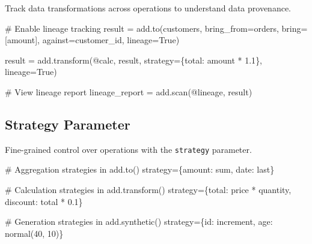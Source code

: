 \documentclass[
  letterpaper,
]{scrbook}
\newenvironment{Shaded}{\begin{snugshade}}{\end{snugshade}}
\newcommand{\CommentTok}[1]{\textcolor[rgb]{0.37,0.37,0.37}{#1}}
\newcommand{\NormalTok}[1]{\textcolor[rgb]{0.00,0.23,0.31}{#1}}
\newcommand{\OperatorTok}[1]{\textcolor[rgb]{0.37,0.37,0.37}{#1}}
\newcommand{\StringTok}[1]{\textcolor[rgb]{0.13,0.47,0.30}{#1}}
\newcommand{\VariableTok}[1]{\textcolor[rgb]{0.07,0.07,0.07}{#1}}
\begin{document}
Track data transformations across operations to understand data
provenance.

\begin{Shaded}
\begin{Highlighting}[]
\CommentTok{\# Enable lineage tracking}
\NormalTok{result }\OperatorTok{=}\NormalTok{ add.to(customers, bring\_from}\OperatorTok{=}\NormalTok{orders, bring}\OperatorTok{=}\NormalTok{[}\StringTok{\textquotesingle{}amount\textquotesingle{}}\NormalTok{], }
\NormalTok{                against}\OperatorTok{=}\StringTok{\textquotesingle{}customer\_id\textquotesingle{}}\NormalTok{, lineage}\OperatorTok{=}\VariableTok{True}\NormalTok{)}

\NormalTok{result }\OperatorTok{=}\NormalTok{ add.transform(}\StringTok{\textquotesingle{}@calc\textquotesingle{}}\NormalTok{, result, strategy}\OperatorTok{=}\NormalTok{\{}\StringTok{\textquotesingle{}total\textquotesingle{}}\NormalTok{: }\StringTok{\textquotesingle{}amount * 1.1\textquotesingle{}}\NormalTok{\}, }
\NormalTok{                       lineage}\OperatorTok{=}\VariableTok{True}\NormalTok{)}

\CommentTok{\# View lineage report}
\NormalTok{lineage\_report }\OperatorTok{=}\NormalTok{ add.scan(}\StringTok{\textquotesingle{}@lineage\textquotesingle{}}\NormalTok{, result)}
\end{Highlighting}
\end{Shaded}

\subsection{Strategy Parameter}\label{strategy-parameter}

Fine-grained control over operations with the \texttt{strategy}
parameter.

\begin{Shaded}
\begin{Highlighting}[]
\CommentTok{\# Aggregation strategies in add.to()}
\NormalTok{strategy}\OperatorTok{=}\NormalTok{\{}\StringTok{\textquotesingle{}amount\textquotesingle{}}\NormalTok{: }\StringTok{\textquotesingle{}sum\textquotesingle{}}\NormalTok{, }\StringTok{\textquotesingle{}date\textquotesingle{}}\NormalTok{: }\StringTok{\textquotesingle{}last\textquotesingle{}}\NormalTok{\}}

\CommentTok{\# Calculation strategies in add.transform()}
\NormalTok{strategy}\OperatorTok{=}\NormalTok{\{}\StringTok{\textquotesingle{}total\textquotesingle{}}\NormalTok{: }\StringTok{\textquotesingle{}price * quantity\textquotesingle{}}\NormalTok{, }\StringTok{\textquotesingle{}discount\textquotesingle{}}\NormalTok{: }\StringTok{\textquotesingle{}total * 0.1\textquotesingle{}}\NormalTok{\}}

\CommentTok{\# Generation strategies in add.synthetic()}
\NormalTok{strategy}\OperatorTok{=}\NormalTok{\{}\StringTok{\textquotesingle{}id\textquotesingle{}}\NormalTok{: }\StringTok{\textquotesingle{}increment\textquotesingle{}}\NormalTok{, }\StringTok{\textquotesingle{}age\textquotesingle{}}\NormalTok{: }\StringTok{\textquotesingle{}normal(40, 10)\textquotesingle{}}\NormalTok{\}}
\end{Highlighting}
\end{Shaded}
\end{document}
